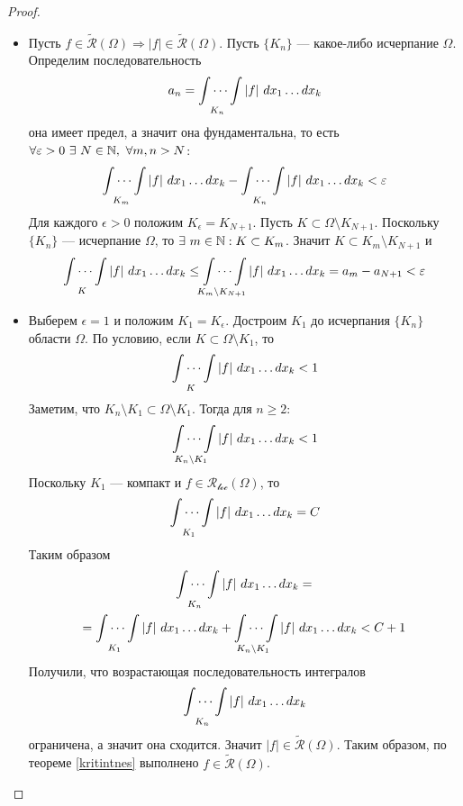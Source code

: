 \begin{proof}\tab
    \begin{itemize}
        \item[$(\Rightarrow)$:]
        Пусть $f\in \widetilde{\mathcal{R}}(\Omega) \Rightarrow |f|\in \widetilde{\mathcal{R}}(\Omega)$. Пусть $\{K_n\}$ --- какое-либо исчерпание $\Omega$. Определим последовательность
        \[a_n=\idotsint\limits_{K_n}|f|\ dx_1 \dots dx_k\]
        она имеет предел, а значит она фундаментальна, то есть \\
        $\forall \epsilon>0\ \exists\ N\in \N,\ \forall m,n>N$:
        \[\idotsint\limits_{K_m}|f|\ dx_1 \dots dx_k-\idotsint\limits_{K_n}|f|\ dx_1 \dots dx_k<\epsilon\]
        Для каждого $\epsilon>0$ положим $K_{\epsilon}=K_{N+1}$. Пусть $K\subset \Omega\setminus K_{N+1}$. Поскольку $\{K_n\}$ --- исчерпание $\Omega$, то $\exists\ m \in \N: K\subset K_m$. Значит $K\subset K_m\setminus K_{N+1}$ и
        \[\idotsint\limits_K |f|\ dx_1 \dots dx_k\leq \idotsint\limits_{K_m\setminus K_{N+1}}|f|\ dx_1 \dots dx_k=a_m-a_{N+1}<\epsilon\]
        \item[$(\Leftarrow)$:]
        Выберем $\epsilon=1$ и положим $K_1=K_{\epsilon}$. Достроим $K_1$ до исчерпания $\{K_n\}$ области $\Omega$. По условию, если $K\subset \Omega\setminus K_{1}$, то
        \[\idotsint\limits_{K}|f|\ dx_1 \dots dx_k<1\]
        Заметим, что $K_n\setminus K_1\subset \Omega\setminus K_1$. Тогда для $n\geq 2$:
        \[\idotsint\limits_{K_n\setminus K_1}|f|\ dx_1 \dots dx_k<1\]
        Поскольку $K_1$ --- компакт и $f\in \mathcal{R_{\text{loc}}}(\Omega)$, то 
        \[\idotsint\limits_{K_1}|f|\ dx_1 \dots dx_k=C\]
        Таким образом
        \begin{multline*}
            \idotsint\limits_{K_n}|f|\ dx_1 \dots dx_k=\\
            =\idotsint\limits_{K_1}|f|\ dx_1 \dots dx_k+\idotsint\limits_{K_n\setminus K_1}|f|\ dx_1 \dots dx_k<C+1
        \end{multline*}
        Получили, что возрастающая последовательность интегралов
        \[\idotsint\limits_{K_n}|f|\ dx_1 \dots dx_k\]
        ограничена, а значит она сходится. Значит $|f|\in \widetilde{\mathcal{R}}(\Omega)$. Таким образом, по теореме \ref{kritintnes} выполнено $f\in \widetilde{\mathcal{R}}(\Omega)$.
    \end{itemize}
\end{proof}
